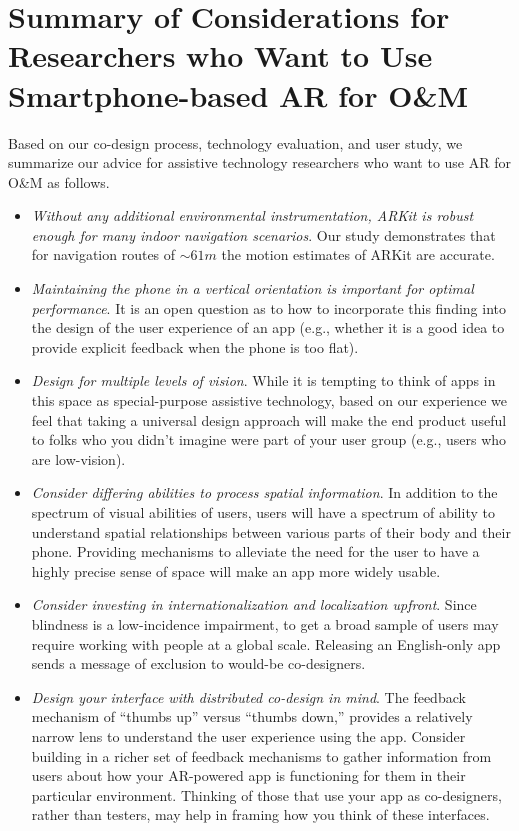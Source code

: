 \documentclass[chi_draft]{sigchi}
\newcommand{\OM}{O\&M\xspace}
\begin{document}
\section{Summary of Considerations for Researchers who Want to Use Smartphone-based AR for \OM}

Based on our co-design process, technology evaluation, and user study, we summarize our advice for assistive technology researchers who want to use AR for \OM as follows.

\begin{itemize}
\item \emph{Without any additional environmental instrumentation, ARKit is robust enough for many indoor navigation scenarios}.  Our study demonstrates that for navigation routes of $\sim61m$ the motion estimates of ARKit are accurate.
\item \emph{Maintaining the phone in a vertical orientation is important for optimal performance}.  It is an open question as to how to incorporate this finding into the design of the user experience of an app (e.g., whether it is a good idea to provide explicit feedback when the phone is too flat).
\item \emph{Design for multiple levels of vision}.  While it is tempting to think of apps in this space as special-purpose assistive technology, based on our experience we feel that taking a universal design approach will make the end product useful to folks who you didn't imagine were part of your user group (e.g., users who are low-vision).
\item \emph{Consider differing abilities to process spatial information}.  In addition to the spectrum of visual abilities of users, users will have a spectrum of ability to understand spatial relationships between various parts of their body and their phone.  Providing mechanisms to alleviate the need for the user to have a highly precise sense of space will make an app more widely usable.
\item \emph{Consider investing in internationalization and localization upfront}.  Since blindness is a low-incidence impairment, to get a broad sample of users may require working with people at a global scale.  Releasing an English-only app sends a message of exclusion to would-be co-designers.

\item \emph{Design your interface with distributed co-design in mind}.  The feedback mechanism of ``thumbs up'' versus ``thumbs down,'' provides a relatively narrow lens to understand the user experience using the app.  Consider building in a richer set of feedback mechanisms to gather information from users about how your AR-powered app is functioning for them in their particular environment.  Thinking of those that use your app as co-designers, rather than testers, may help in framing how you think of these interfaces.


\end{itemize}
\end{document}
